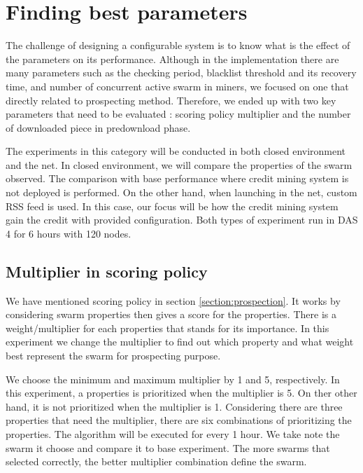 
\section{Finding best parameters}
\label{section:cmparamexp}
The challenge of designing a configurable system is to know what is the effect of the parameters on its performance. Although in the implementation there are many parameters such as the checking period, blacklist threshold and its recovery time, and number of concurrent active swarm in miners, we focused on one that directly related to prospecting method. Therefore, we ended up with two key parameters that need to be evaluated : scoring policy multiplier and the number of downloaded piece in predownload phase.

The experiments in this category will be conducted in both closed environment and the net. In closed environment, we will compare the properties of the swarm observed. The comparison with base performance where credit mining system is not deployed is performed. On the other hand, when launching in the net, custom RSS feed is used. In this case, our focus will be how the credit mining system gain the credit with provided configuration. Both types of experiment run in DAS 4 for 6 hours with 120 nodes. 

\subsection{Multiplier in scoring policy}
We have mentioned scoring policy in section \ref{section:prospection}. It works by considering swarm properties then gives a score for the properties. There is a weight/multiplier for each properties that stands for its importance. In this experiment we change the multiplier to find out which property and what weight best represent the swarm for prospecting purpose.

We choose the minimum and maximum multiplier by 1 and 5, respectively. In this experiment, a properties is prioritized when the multiplier is 5. On ther other hand, it is not prioritized when the multiplier is 1. Considering there are three properties that need the multiplier, there are six combinations of prioritizing the properties. The algorithm will be executed for every 1 hour. We take note the swarm it choose and compare it to base experiment. The more swarms that selected correctly, the better multiplier combination define the swarm.

